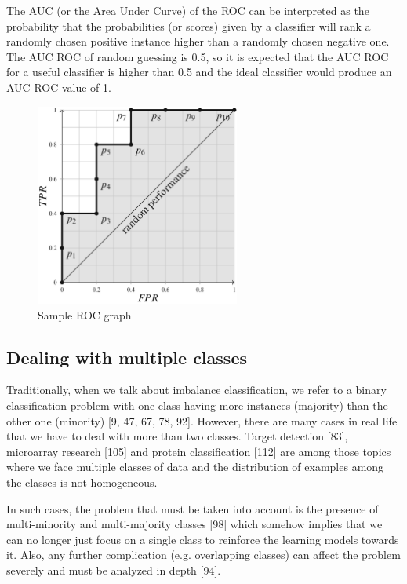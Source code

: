 The AUC (or the Area Under Curve) of the ROC can be interpreted as the probability that the 
probabilities (or scores) given by a classifier will rank a randomly chosen positive instance 
higher than a randomly chosen negative one. The AUC ROC of random guessing is 0.5, so it is 
expected that the AUC ROC for a useful classifier is higher than 0.5 and the ideal classifier 
would produce an AUC ROC value of 1.

\begin{figure}[ht]
    \centering
    \includegraphics[width=0.60\textwidth]{figures/12RocExample.png}
    \caption{Sample ROC graph}
    \label{fig:roc}
\end{figure}


\subsection{Dealing with multiple classes}

Traditionally, when we talk about imbalance classification, we refer to a binary classification problem with one class having more instances (majority) than the other one (minority) [9, 47, 67, 78, 92]. However, there are many cases in real life that we have to deal with more than two classes. Target detection [83],  microarray research [105] and protein classification [112] are among those topics where we face multiple classes of data and the distribution of examples among the classes is not homogeneous.
 
In such cases, the problem that must be taken into account is the presence of multi-minority and multi-majority classes [98] which somehow implies that we can no longer just focus on a single class to reinforce the learning models towards it. Also, any further complication (e.g. overlapping classes) can affect the problem severely and must be analyzed in depth [94].

